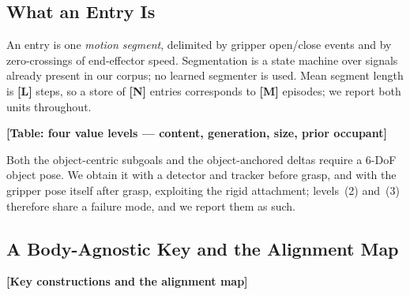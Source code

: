 \documentclass[letterpaper, 10 pt, conference]{ieeeconf}
\newcommand{\todo}[1]{\textbf{[#1]}}
\begin{document}
\subsection{What an Entry Is}
\label{sec:method:entry}

An entry is one \emph{motion segment}, delimited by gripper open/close events and
by zero-crossings of end-effector speed. Segmentation is a state machine over
signals already present in our corpus; no learned segmenter is used. Mean segment
length is \todo{L} steps, so a store of \todo{N} entries corresponds to \todo{M}
episodes; we report both units throughout.

\todo{Table: four value levels --- content, generation, size, prior occupant}

Both the object-centric subgoals and the object-anchored deltas require a 6-DoF
object pose. We obtain it with a detector and tracker before grasp, and with the
gripper pose itself after grasp, exploiting the rigid attachment; levels~(2)
and~(3) therefore share a failure mode, and we report them as such.

\subsection{A Body-Agnostic Key and the Alignment Map}
\label{sec:method:key}

\todo{Key constructions and the alignment map}
\end{document}

